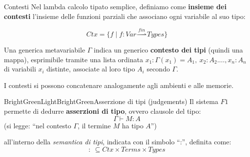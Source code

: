 \documentclass[a4paper,11pt]{report}
\newcommand{\farrow}{\overset{fin}{\rightharpoonup}}
\begin{document}
\begin{defframe}{Contesti}{}
    Nel lambda calcolo tipato semplice, definiamo come \textbf{insieme dei contesti} l'insieme delle funzioni parziali che associano ogni variabile al suo tipo:

    \[ Ctx = \{f \mid f: Var \farrow Types\} \]

    Una generica metavariabile \( \Gamma \) indica un generico \textbf{contesto dei tipi} (quindi una mappa), esprimibile tramite una lista ordinata \( x_1: \Gamma(x_1) = A_1, \ x_2: A_2. \dots, x_n: A_n \) di variabili \( x_i \) distinte, associate al loro tipo \( A_i \) secondo \( \Gamma \).

    I contesti si possono concatenare analogamente agli ambienti e alle memorie.
\end{defframe}

\begin{cdefframe}{BrightGreenLight}{BrightGreen}{Asserzione di tipi (judgements)}{}
    Il sistema \( F1 \) permette di dedurre \textbf{asserzioni di tipo}, ovvero clausole del tipo:
    \[ \Gamma\vdash M: A \]
    {\color{gray}\small (si legge: ``nel contesto \( \Gamma \), il termine \( M \) ha tipo \( A \)'')}

    all'interno della \textit{semantica di tipi}, indicata con il simbolo ``:'', definita come:
    \[ : \ \subseteq Ctx \times Terms \times Types \]
\end{cdefframe}
\end{document}
